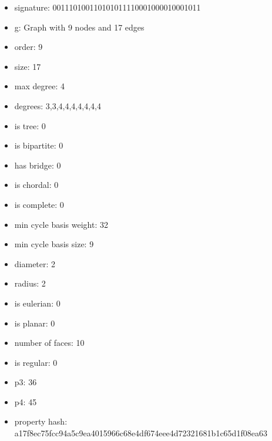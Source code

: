\newpage
\begin{figure}
\end{figure}
\begin{itemize}
\item signature: 001110100110101011110001000010001011
\item g: Graph with 9 nodes and 17 edges
\item order: 9
\item size: 17
\item max degree: 4
\item degrees: 3,3,4,4,4,4,4,4,4
\item is tree: 0
\item is bipartite: 0
\item has bridge: 0
\item is chordal: 0
\item is complete: 0
\item min cycle basis weight: 32
\item min cycle basis size: 9
\item diameter: 2
\item radius: 2
\item is eulerian: 0
\item is planar: 0
\item number of faces: 10
\item is regular: 0
\item p3: 36
\item p4: 45
\item property hash: a17f8ec75fcc94a5c9ea4015966c68e4df674eee4d72321681b1c65d1f08ea63
\end{itemize}
